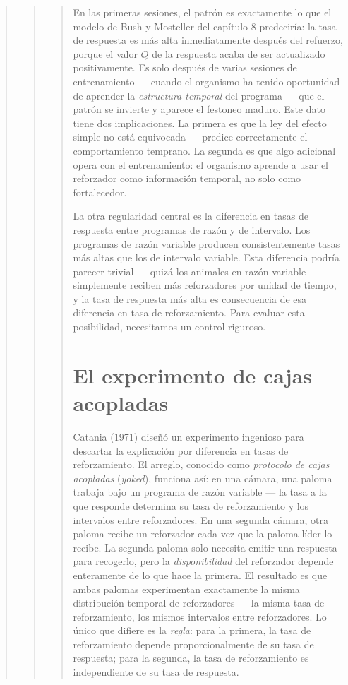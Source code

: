 \documentclass[
  letterpaper,
  DIV=11,
  numbers=noendperiod]{scrreprt}
\begin{document}
\begin{tcolorbox}[enhanced jigsaw, arc=.35mm, bottomrule=.15mm, breakable, colback=white, colframe=quarto-callout-note-color-frame, left=2mm, leftrule=.75mm, opacityback=0, rightrule=.15mm, toprule=.15mm]
\begin{quote}
\begin{quote}
\begin{quote}
En las primeras sesiones, el patrón es exactamente lo que el modelo de
Bush y Mosteller del capítulo 8 predeciría: la tasa de respuesta es más
alta inmediatamente después del refuerzo, porque el valor \(Q\) de la
respuesta acaba de ser actualizado positivamente. Es solo después de
varias sesiones de entrenamiento --- cuando el organismo ha tenido
oportunidad de aprender la \emph{estructura temporal} del programa ---
que el patrón se invierte y aparece el festoneo maduro. Este dato tiene
dos implicaciones. La primera es que la ley del efecto simple no está
equivocada --- predice correctamente el comportamiento temprano. La
segunda es que algo adicional opera con el entrenamiento: el organismo
aprende a usar el reforzador como información temporal, no solo como
fortalecedor.

La otra regularidad central es la diferencia en tasas de respuesta entre
programas de razón y de intervalo. Los programas de razón variable
producen consistentemente tasas más altas que los de intervalo variable.
Esta diferencia podría parecer trivial --- quizá los animales en razón
variable simplemente reciben más reforzadores por unidad de tiempo, y la
tasa de respuesta más alta es consecuencia de esa diferencia en tasa de
reforzamiento. Para evaluar esta posibilidad, necesitamos un control
riguroso.

\mbox{}%
\section{El experimento de cajas
acopladas}\label{el-experimento-de-cajas-acopladas}

Catania (1971) diseñó un experimento ingenioso para descartar la
explicación por diferencia en tasas de reforzamiento. El arreglo,
conocido como \emph{protocolo de cajas acopladas} (\emph{yoked}),
funciona así: en una cámara, una paloma trabaja bajo un programa de
razón variable --- la tasa a la que responde determina su tasa de
reforzamiento y los intervalos entre reforzadores. En una segunda
cámara, otra paloma recibe un reforzador cada vez que la paloma líder lo
recibe. La segunda paloma solo necesita emitir una respuesta para
recogerlo, pero la \emph{disponibilidad} del reforzador depende
enteramente de lo que hace la primera. El resultado es que ambas palomas
experimentan exactamente la misma distribución temporal de reforzadores
--- la misma tasa de reforzamiento, los mismos intervalos entre
reforzadores. Lo único que difiere es la \emph{regla}: para la primera,
la tasa de reforzamiento depende proporcionalmente de su tasa de
respuesta; para la segunda, la tasa de reforzamiento es independiente de
su tasa de respuesta.


\end{quote}
\end{quote}
\end{quote}
\end{tcolorbox}
\end{document}
